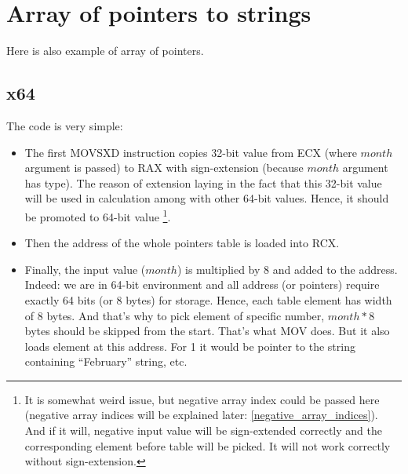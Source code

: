﻿%
\ifdefined\RUSSIAN
\else
\section{Array of pointers to strings}
\label{array_of_pointers_to_strings}

Here is also example of array of pointers.



\subsection{x64}



The code is very simple:

\begin{itemize}

\item
{}
The first MOVSXD instruction copies 32-bit value from ECX (where $month$ argument is passed) 
to RAX with sign-extension (because $month$ argument has \Tint type).
The reason of extension laying in the fact that this 32-bit value will be used in calculation among
with other 64-bit values. 
Hence, it should be promoted to 64-bit value
\footnote{It is somewhat weird issue, but negative array index could be passed here 
(negative array indices will be explained later: \ref{negative_array_indices}). 
And if it will, negative input \Tint value will be sign-extended correctly 
and the corresponding element before table will be picked. 
It will not work correctly without sign-extension.}.

\item
Then the address of the whole pointers table is loaded into RCX.

\item
Finally, the input value ($month$) is multiplied by 8 and added to the address.
Indeed: we are in 64-bit environment and all address (or pointers) require exactly 64 bits (or 8 bytes) 
for storage.
Hence, each table element has width of 8 bytes.
And that's why to pick element of specific number, $month*8$ bytes should be skipped from the start.
That's what MOV does.
But it also loads element at this address.
For 1 it would be pointer to the string containing ``February'' string, etc.

\end{itemize}

